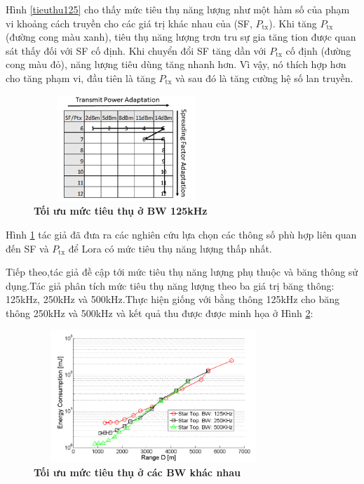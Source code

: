 \documentclass{article} %
\begin{document}
	Hình \ref{tieuthu125} cho thấy mức tiêu thụ năng lượng như một hàm số của phạm vi khoảng cách truyền cho các giá trị khác nhau của (SF, $P_{\mathrm{tx}}$). Khi tăng $P_{\mathrm{tx}}$ (đường cong màu xanh), tiêu thụ năng lượng trơn tru sự gia tăng tion được quan sát thấy đối với SF cố định. Khi chuyển đổi SF tăng dần với $P_{\mathrm{tx}}$ cố định (đường cong màu đỏ), năng lượng tiêu dùng tăng nhanh hơn. Vì vậy, nó thích hợp hơn cho tăng phạm vi, đầu tiên là tăng $P_{\mathrm{tx}}$ và sau đó là tăng cường hệ số lan truyền.
	
	\begin{figure}[!ht]
		\centering
		\includegraphics[width=7cm,height=4cm]{Images/chienluoccs.png}
		\caption[Tối ưu mức tiêu thụ ở BW 125kHz\cite{ochoa2017evaluating}]
		{\bfseries \fontsize{12pt}{0pt}\selectfont Tối ưu mức tiêu thụ ở BW 125kHz\cite{ochoa2017evaluating}}
		\label{chienluoccs}
	\end{figure}
	
	Hình \ref{chienluoccs} tác giả đã đưa ra các nghiên cứu lựa chọn các thông số phù hợp liên quan đến SF và $P_{\mathrm{tx}}$ để Lora có mức tiêu thụ năng lượng thấp nhất.
	
	Tiếp theo,tác giả đề cập tới mức tiêu thụ năng lượng phụ thuộc và băng thông sử dụng.Tác giả phân tích mức tiêu thụ năng lượng theo ba giá trị băng thông: 125kHz, 250kHz và 500kHz.Thực hiện giống với bằng thông 125kHz cho băng thông 250kHz và 500kHz và kết quả thu được được minh họa ở Hình \ref{tieuthuall}:
	
	\begin{figure}[!ht]
		\centering
		\includegraphics[width=9cm,height=5cm]{Images/tieuthuall.png}
		\caption[Tối ưu mức tiêu thụ ở các BW khác nhau\cite{ochoa2017evaluating}]
		{\bfseries \fontsize{12pt}{0pt}\selectfont Tối ưu mức tiêu thụ ở các BW khác nhau \cite{ochoa2017evaluating}}
		\label{tieuthuall}
	\end{figure}
	
\end{document}
